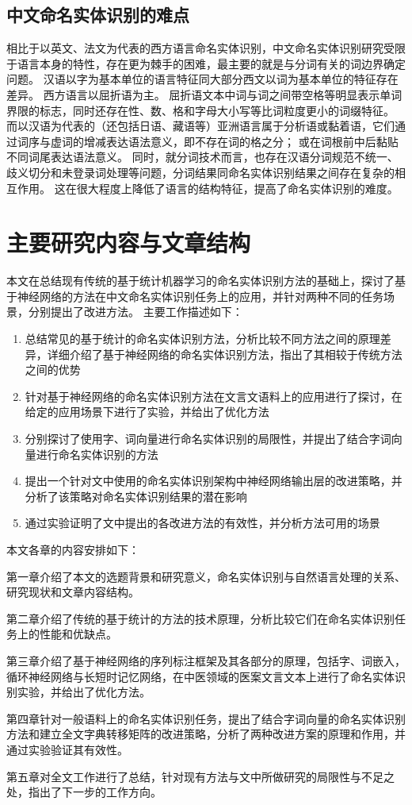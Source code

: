 \subsection{中文命名实体识别的难点}
相比于以英文、法文为代表的西方语言命名实体识别，中文命名实体识别研究受限于语言本身的特性，存在更为棘手的困难，最主要的就是与分词有关的词边界确定问题。
汉语以字为基本单位的语言特征同大部分西文以词为基本单位的特征存在差异。
西方语言以屈折语为主。
屈折语文本中词与词之间带空格等明显表示单词界限的标志，同时还存在性、数、格和字母大小写等比词粒度更小的词缀特征。
而以汉语为代表的（还包括日语、藏语等）亚洲语言属于分析语或黏着语，它们通过词序与虚词的增减表达语法意义，即不存在词的格之分；
或在词根前中后黏贴不同词尾表达语法意义。
同时，就分词技术而言，也存在汉语分词规范不统一、歧义切分和未登录词处理等问题，分词结果同命名实体识别结果之间存在复杂的相互作用。
这在很大程度上降低了语言的结构特征，提高了命名实体识别的难度。
\section{主要研究内容与文章结构}
本文在总结现有传统的基于统计机器学习的命名实体识别方法的基础上，探讨了基于神经网络的方法在中文命名实体识别任务上的应用，并针对两种不同的任务场景，分别提出了改进方法。
主要工作描述如下：
\begin{enumerate}
    \item 总结常见的基于统计的命名实体识别方法，分析比较不同方法之间的原理差异，详细介绍了基于神经网络的命名实体识别方法，指出了其相较于传统方法之间的优势
    \item 针对基于神经网络的命名实体识别方法在文言文语料上的应用进行了探讨，在给定的应用场景下进行了实验，并给出了优化方法
    \item 分别探讨了使用字、词向量进行命名实体识别的局限性，并提出了结合字词向量进行命名实体识别的方法
    \item 提出一个针对文中使用的命名实体识别架构中神经网络输出层的改进策略，并分析了该策略对命名实体识别结果的潜在影响
    \item 通过实验证明了文中提出的各改进方法的有效性，并分析方法可用的场景
\end{enumerate}
本文各章的内容安排如下：

第一章介绍了本文的选题背景和研究意义，命名实体识别与自然语言处理的关系、研究现状和文章内容结构。

第二章介绍了传统的基于统计的方法的技术原理，分析比较它们在命名实体识别任务上的性能和优缺点。

第三章介绍了基于神经网络的序列标注框架及其各部分的原理，包括字、词嵌入，循环神经网络与长短时记忆网络，在中医领域的医案文言文本上进行了命名实体识别实验，并给出了优化方法。

第四章针对一般语料上的命名实体识别任务，提出了结合字词向量的命名实体识别方法和建立全文字典转移矩阵的改进策略，分析了两种改进方案的原理和作用，并通过实验验证其有效性。

第五章对全文工作进行了总结，针对现有方法与文中所做研究的局限性与不足之处，指出了下一步的工作方向。
